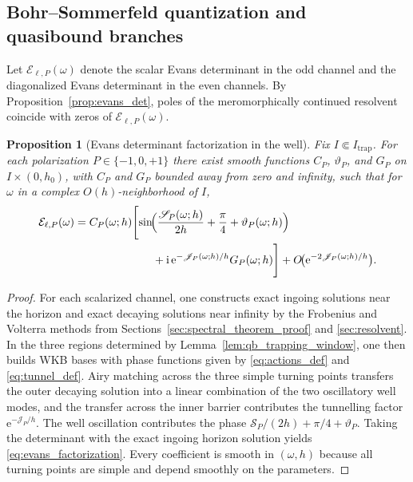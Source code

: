 \documentclass[12pt]{article}
\numberwithin{equation}{section}
\theoremstyle{plain}
\newtheorem{proposition}[theorem]{Proposition}
\theoremstyle{definition}
\theoremstyle{remark}
\newcommand{\ii}{\mathrm i}
\newcommand{\ee}{\mathrm e}
\newcommand{\cE}{\mathcal E}
\begin{document}
\subsection{Bohr--Sommerfeld quantization and quasibound branches}

Let $\cE_{\ell,P}(\omega)$ denote the scalar Evans determinant in the odd channel and the diagonalized Evans determinant in the even channels.  By Proposition~\ref{prop:evans_det}, poles of the meromorphically continued resolvent coincide with zeros of $\cE_{\ell,P}(\omega)$.

\begin{proposition}[Evans determinant factorization in the well]\label{prop:evans_factor}
Fix $I\Subset I_{\mathrm{trap}}$.  For each polarization $P\in\{-1,0,+1\}$ there exist smooth functions $C_P$, $\vartheta_P$, and $G_P$ on $I\times(0,h_0)$, with $C_P$ and $G_P$ bounded away from zero and infinity, such that for $\omega$ in a complex $O(h)$-neighborhood of $I$,
\begin{equation}\label{eq:evans_factorization}
\begin{aligned}
   \cE_{\ell,P}(\omega)
   &=
   C_P(\omega;h)
   \Biggl[
      \sin\!\Bigl(\frac{\mathscr S_P(\omega;h)}{2h}+\frac\pi4+\vartheta_P(\omega;h)\Bigr)
\\
   &\hspace{7em}+
      \ii\,\ee^{-\mathscr J_P(\omega;h)/h}G_P(\omega;h)
   \Biggr]
   +O\!\bigl(\ee^{-2\mathscr J_P(\omega;h)/h}\bigr).
\end{aligned}
\end{equation}
\end{proposition}

\begin{proof}
For each scalarized channel, one constructs exact ingoing solutions near the horizon and exact decaying solutions near infinity by the Frobenius and Volterra methods from Sections~\ref{sec:spectral_theorem_proof} and \ref{sec:resolvent}.  In the three regions determined by Lemma~\ref{lem:qb_trapping_window}, one then builds WKB bases with phase functions given by \eqref{eq:actions_def} and \eqref{eq:tunnel_def}.  Airy matching across the three simple turning points transfers the outer decaying solution into a linear combination of the two oscillatory well modes, and the transfer across the inner barrier contributes the tunnelling factor $\ee^{-\mathscr J_P/h}$.  The well oscillation contributes the phase $\mathscr S_P/(2h)+\pi/4+\vartheta_P$.  Taking the determinant with the exact ingoing horizon solution yields \eqref{eq:evans_factorization}.  Every coefficient is smooth in $(\omega,h)$ because all turning points are simple and depend smoothly on the parameters.
\end{proof}
\end{document}
